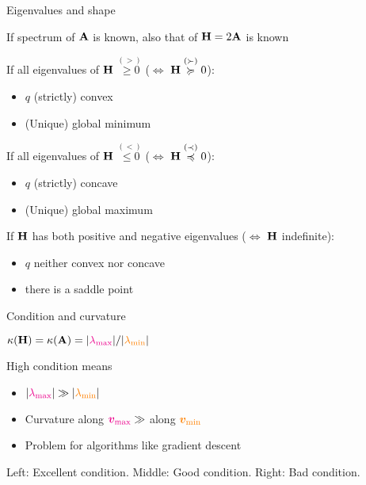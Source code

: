 \documentclass[11pt,compress,t,notes=noshow, xcolor=table]{beamer}
\begin{document}
\begin{framei}{Eigenvalues and shape}
\item If spectrum of $\mathbf{A}$ is known, also that of $\mathbf{H} = 2\mathbf{A}$ is known
\item If all eigenvalues of $\mathbf{H}$ $\overset{(>)}{\ge 0}$ ($\Leftrightarrow$ $\mathbf{H} \overset{(\succ)}{\succcurlyeq} 0$):
\begin{itemize}
\item $q$ (strictly) convex
\item (Unique) global minimum
\end{itemize}
\item If all eigenvalues of $\mathbf{H}$ $\overset{(<)}{\le 0}$ ($\Leftrightarrow$ $\mathbf{H} \overset{(\prec)}{\preccurlyeq} 0$):
\begin{itemize}
\item $q$ (strictly) concave
\item (Unique) global maximum
\end{itemize}
\item If $\mathbf{H}$ has both positive and negative eigenvalues ($\Leftrightarrow$ $\mathbf{H}$ indefinite):
\begin{itemize}
\item $q$ neither convex nor concave
\item there is a saddle point
\end{itemize}
\end{framei}

\begin{framei}{Condition and curvature}
\item $\kappa(\mathbf{H}) = \kappa(\mathbf{A}) = |\textcolor{magenta}{\lambda_\text{max}}| / |\textcolor{orange}{\lambda_\text{min}}|$
\item High condition means
\begin{itemize}
\item $|\textcolor{magenta}{\lambda_\text{max}}| \gg |\textcolor{orange}{\lambda_\text{min}}|$
\item Curvature along $\textcolor{magenta}{\bm{v}_\text{max}} \gg$ along $\textcolor{orange}{\bm{v}_\text{min}}$
\item Problem for algorithms like gradient descent
\end{itemize}
{\footnotesize Left: Excellent condition. Middle: Good condition. Right: Bad condition.}
\end{framei}
\end{document}
